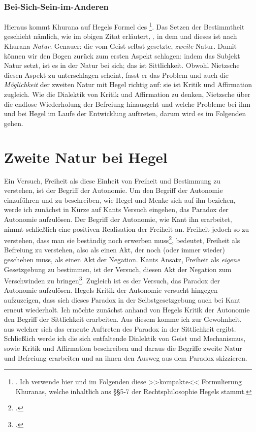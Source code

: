 \documentclass[12pt, a4paper, openany]{report}
\begin{document}
\subsubsection{Bei-Sich-Sein-im-Anderen}
Hieraus kommt Khurana auf Hegels Formel des %
\footnote{
    \cite[][283]{khurana_freiheit_2017}.
    Ich verwende hier und im Folgenden diese >>kompakte<< Formulierung Khuranas, welche inhaltlich aus §§5-7 der Rechtsphilosophie Hegels stammt.
}.
Das Setzen der Bestimmtheit geschieht nämlich, wie im obigen Zitat erläutert, , in dem  und dieses ist nach Khurana \emph{Natur}. 
Genauer: die vom Geist selbst gesetzte, \emph{zweite} Natur.
Damit können wir den Bogen zurück zum ersten Aspekt schlagen: 
indem das Subjekt Natur setzt, ist es in der Natur bei sich; das ist Sittlichkeit.
Obwohl Nietzsche diesen Aspekt zu unterschlagen scheint, fasst er das Problem und auch die \emph{Möglichkeit} der zweiten Natur mit Hegel richtig auf: 
sie ist Kritik und Affirmation zugleich.
Wie die Dialektik von Kritik und Affirmation zu denken, Nietzsche über die endlose Wiederholung der Befreiung hinausgeht und welche Probleme bei ihm und bei Hegel im Laufe der Entwicklung auftreten, darum wird es im Folgenden gehen.

\section{Zweite Natur bei Hegel}\label{abschnitt_1}
Ein Versuch, Freiheit als diese Einheit von Freiheit und Bestimmung zu verstehen, ist der Begriff der Autonomie. 
Um den Begriff der Autonomie einzuführen und zu beschreiben, wie Hegel und Menke sich auf ihn beziehen, werde ich zunächst in Kürze auf Kants Versuch eingehen, das Paradox der Autonomie aufzulösen.
Der Begriff der Autonomie, wie Kant ihn erarbeitet, nimmt schließlich eine positiven Realisation der Freiheit an.
Freiheit jedoch so zu verstehen, dass man sie beständig noch erwerben muss\footcite[Vgl.][636]{nietzsche_morgenrote_1999}, bedeutet, Freiheit als Befreiung zu verstehen, also als einen Akt, der noch (oder immer wieder) geschehen muss, als einen Akt der Negation.
Kants Ansatz, Freiheit als \emph{eigene} Gesetzgebung zu bestimmen, ist der Versuch, diesen Akt der Negation zum Verschwinden zu bringen\footcite[Vgl.][53]{menke_autonomie_2018}.
Zugleich ist es der Versuch, das Paradox der Autonomie aufzulösen.
Hegels Kritik der Autonomie versucht hingegen aufzuzeigen, dass sich dieses Paradox in der Selbstgesetzgebung auch bei Kant erneut wiederholt.
Ich möchte zunächst anhand von Hegels Kritik der Autonomie den Begriff der Sittlichkeit erarbeiten.
Aus diesem komme ich zur Gewohnheit, aus welcher sich das erneute Auftreten des Paradox in der Sittlichkeit ergibt.
Schließlich werde ich die sich entfaltende Dialektik von Geist und Mechanismus, sowie Kritik und Affirmation beschreiben und daraus die Begriffe zweite Natur und Befreiung erarbeiten und an ihnen den Ausweg aus dem Paradox skizzieren.
\end{document}
